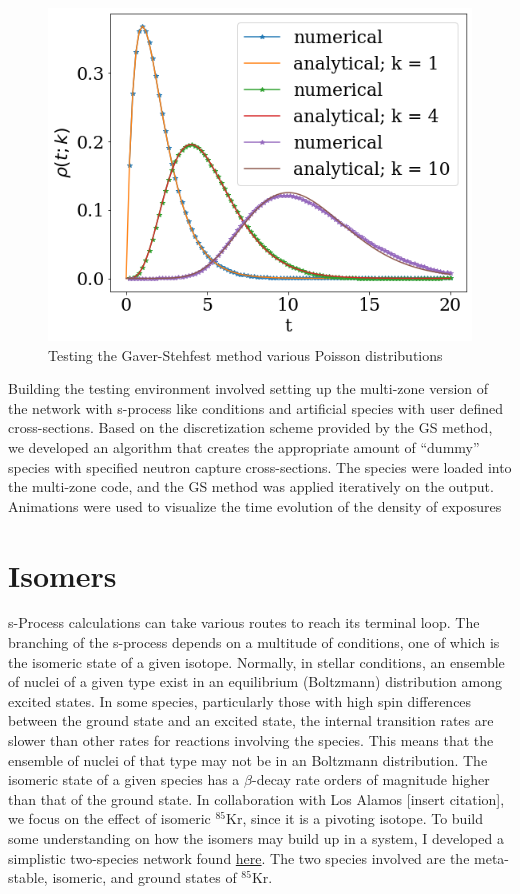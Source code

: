 \documentclass{article}
\begin{document}
\begin{figure}[!htp]
    \centerline{\includegraphics[scale = 0.5]{images/poisson_test.png}}
    \caption{Testing the Gaver-Stehfest method various Poisson distributions}
    \label{fig 3}
\end{figure}


Building the testing environment involved setting up the multi-zone version of the network with s-process like conditions and artificial 
species with user defined cross-sections. Based on the discretization scheme provided by the GS method, we developed an algorithm 
that creates the appropriate amount of ``dummy'' species with specified neutron capture cross-sections. The species were loaded into the 
multi-zone code, and the GS method was applied iteratively on the output. Animations were used to visualize the time 
evolution of the density of exposures 

\section*{Isomers}

s-Process calculations can take various routes to reach its terminal loop. The branching of the s-process depends on a multitude of 
conditions, one of which is the isomeric state of a given isotope. Normally,
in stellar conditions, an ensemble of nuclei of a given type exist in
an equilibrium (Boltzmann) distribution among excited states.  In some
species, particularly those with high spin differences between the ground
state and an excited state, the internal transition rates are slower than
other rates for reactions involving the species.  This means that the ensemble
of nuclei of that type may not be in an Boltzmann distribution.
The isomeric state of a given species has a $\beta$-decay rate 
orders of magnitude higher than that of the ground state. In collaboration with Los Alamos [insert citation], we focus on the 
effect of isomeric $^{85}$Kr, since it is a pivoting isotope. To build some understanding on how the isomers may build up in a system, 
I developed a simplistic two-species network found \href{https://github.com/jaadt7/isomer_intuition}{here}.
The two species involved are the meta-stable, isomeric, and ground states of $^{85}$Kr.\\ 
\end{document}
